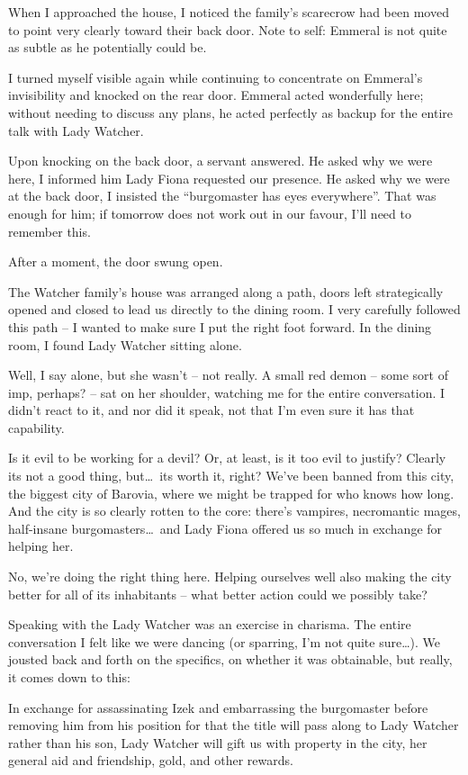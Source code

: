 When I approached the house, I noticed the family's scarecrow had been moved to point very clearly toward their back door. Note to self: Emmeral is not quite as subtle as he potentially could be.

I turned myself visible again while continuing to concentrate on Emmeral's invisibility and knocked on the rear door. Emmeral acted wonderfully here; without needing to discuss any plans, he acted perfectly as backup for the entire talk with Lady Watcher.

Upon knocking on the back door, a servant answered. He asked why we were here, I informed him Lady Fiona requested our presence. He asked why we were at the back door, I insisted the ``burgomaster has eyes everywhere''. That was enough for him; if tomorrow does not work out in our favour, I'll need to remember this.

After a moment, the door swung open.

The Watcher family's house was arranged along a path, doors left strategically opened and closed to lead us directly to the dining room. I very carefully followed this path -- I wanted to make sure I put the right foot forward. In the dining room, I found Lady Watcher sitting alone.

Well, I say alone, but she wasn't -- not really. A small red demon -- some sort of imp, perhaps? -- sat on her shoulder, watching me for the entire conversation. I didn't react to it, and nor did it speak, not that I'm even sure it has that capability.

Is it evil to be working for a devil? Or, at least, is it too evil to justify? Clearly its not a good thing, but\dots\ its worth it, right? We've been banned from this city, the biggest city of Barovia, where we might be trapped for who knows how long. And the city is so clearly rotten to the core: there's vampires, necromantic mages, half-insane burgomasters\dots\ and Lady Fiona offered us so much in exchange for helping her.

No, we're doing the right thing here. Helping ourselves well also making the city better for all of its inhabitants -- what better action could we possibly take?

Speaking with the Lady Watcher was an exercise in charisma. The entire conversation I felt like we were dancing (or sparring, I'm not quite sure\dots). We jousted back and forth on the specifics, on whether it was obtainable, but really, it comes down to this:

In exchange for assassinating Izek and embarrassing the burgomaster before removing him from his position for that the title will pass along to Lady Watcher rather than his son, Lady Watcher will gift us with property in the city, her general aid and friendship, gold, and other rewards.

